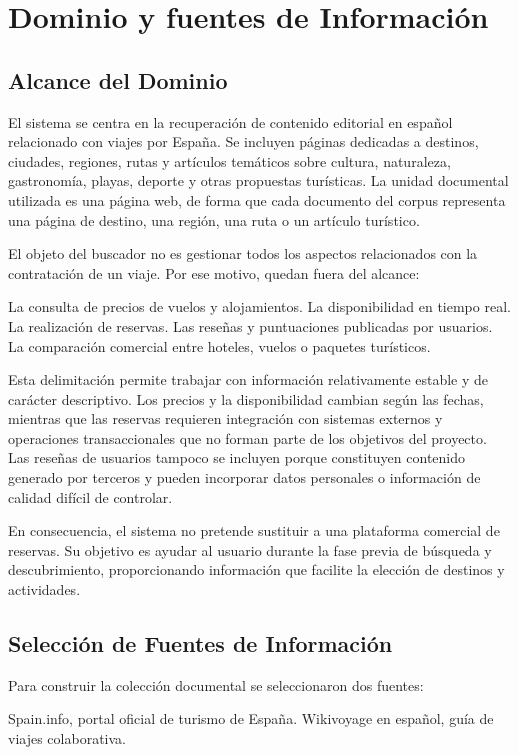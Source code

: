 \chapter{Dominio y fuentes de Información} 
\label{chap:dominio_fuentes} 
\section{Alcance del Dominio}
El sistema se centra en la recuperación de contenido editorial en español relacionado con viajes por España. Se incluyen páginas dedicadas a destinos, ciudades, regiones, rutas y artículos temáticos sobre cultura, naturaleza, gastronomía, playas, deporte y otras propuestas turísticas. La unidad documental utilizada es una página web, de forma que cada documento del corpus representa una página de destino, una región, una ruta o un artículo turístico.

El objeto del buscador no es gestionar todos los aspectos relacionados con la contratación de un viaje. Por ese motivo, quedan fuera del alcance:

La consulta de precios de vuelos y alojamientos.
La disponibilidad en tiempo real.
La realización de reservas.
Las reseñas y puntuaciones publicadas por usuarios.
La comparación comercial entre hoteles, vuelos o paquetes turísticos.

Esta delimitación permite trabajar con información relativamente estable y de carácter descriptivo. Los precios y la disponibilidad cambian según las fechas, mientras que las reservas requieren integración con sistemas externos y operaciones transaccionales que no forman parte de los objetivos del proyecto. Las reseñas de usuarios tampoco se incluyen porque constituyen contenido generado por terceros y pueden incorporar datos personales o información de calidad difícil de controlar.

En consecuencia, el sistema no pretende sustituir a una plataforma comercial de reservas. Su objetivo es ayudar al usuario durante la fase previa de búsqueda y descubrimiento, proporcionando información que facilite la elección de destinos y actividades.

\section{Selección de Fuentes de Información}
Para construir la colección documental se seleccionaron dos fuentes:

Spain.info, portal oficial de turismo de España.
Wikivoyage en español, guía de viajes colaborativa.


